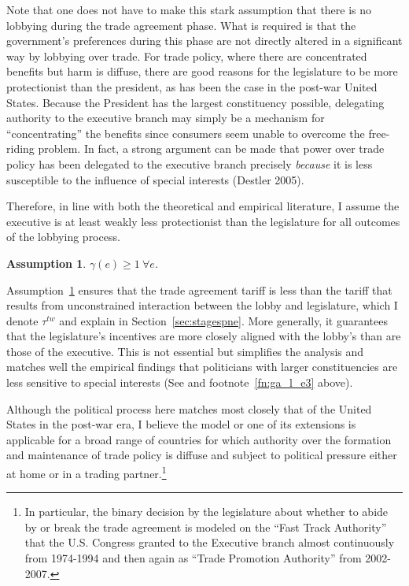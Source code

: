 \documentclass[authoryear, review]{elsarticle}
\newtheorem{assumption}{Assumption}
\newcommand{\ga}{\gamma}
\begin{document}
Note that one does not have to make this stark assumption that there is no lobbying during the trade agreement phase. What is required is that the government's preferences during this phase are not directly altered in a significant way by lobbying over trade. For trade policy, where there are concentrated benefits but harm is diffuse, there are good reasons for the legislature to be more protectionist than the president, as has been the case in the post-war United States. Because the President has the largest constituency possible, delegating authority to the executive branch may simply be a mechanism for ``concentrating'' the benefits since consumers seem unable to overcome the free-riding problem. In fact, a strong argument can be made that power over trade policy has been delegated to the executive branch precisely \textit{because} it is less susceptible to the influence of special interests (Destler 2005). %

Therefore, in line with both the theoretical and empirical literature, I assume the executive is at least weakly less protectionist than the legislature for all outcomes of the lobbying process. 

\begin{assumption}
  $\ga(e) \geq 1 \ \forall e$.
  \label{as:ga_l_e3}
\end{assumption}

Assumption~\ref{as:ga_l_e3} ensures that the trade agreement tariff is less than the tariff that results from unconstrained interaction between the lobby and legislature, which I denote $\tau^{tw}$ and explain in Section~\ref{sec:stagespne}. More generally, it guarantees that the legislature's incentives are more closely aligned with the lobby's than are those of the executive. This is not essential but simplifies the analysis and matches well the empirical findings that politicians with larger constituencies are less sensitive to special interests (See \citet{destler} and footnote~\ref{fn:ga_l_e3} above).

Although the political process here matches most closely that of the United States in the post-war era, I believe the model or one of its extensions is applicable for a broad range of countries for which authority over the formation and maintenance of trade policy is diffuse and subject to political pressure either at home or in a trading partner.\footnote{In particular, the binary decision by the legislature about whether to abide by or break the trade agreement is modeled on the ``Fast Track Authority'' that the U.S. Congress granted to the Executive branch almost continuously from 1974-1994 and then again as ``Trade Promotion Authority'' from 2002-2007.} 
\end{document}
